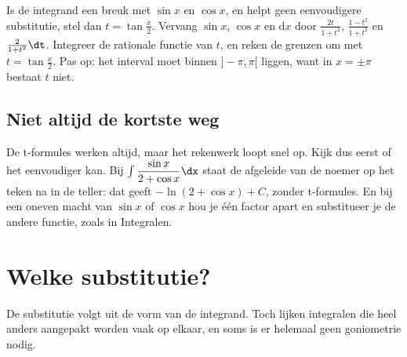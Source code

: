 \begin{werkwijze}
Is de integrand een breuk met $\sin x$ en $\cos x$, en helpt geen eenvoudigere substitutie, stel dan $t = \tan\tfrac x2$. Vervang $\sin x$, $\cos x$ en $\mathrm{d}x$ door $\tfrac{2t}{1 + t^2}$, $\tfrac{1 - t^2}{1 + t^2}$ en $\tfrac{2}{1 + t^2}\dt$. Integreer de rationale functie van $t$, en reken de grenzen om met $t = \tan\tfrac x2$. Pas op: het interval moet binnen $]-\pi, \pi[$ liggen, want in $x = \pm\pi$ bestaat $t$ niet.
\end{werkwijze}

\nujij{Bereken $\int \dfrac{1}{\sin x}\dx$ op $]0, \pi[$.}{$\int \dfrac{1 + t^2}{2t} \cdot \dfrac{2}{1 + t^2}\dt = \ln|t| + C = \ln\tan\dfrac x2 + C$.}

\begin{oefeningen}
\end{oefeningen}

\subsection{Niet altijd de kortste weg}

De t-formules werken altijd, maar het rekenwerk loopt snel op. Kijk dus eerst of het eenvoudiger kan. Bij $\int \dfrac{\sin x}{2 + \cos x}\dx$ staat de afgeleide van de noemer op het teken na in de teller: dat geeft $-\ln(2 + \cos x) + C$, zonder t-formules. En bij een oneven macht van $\sin x$ of $\cos x$ hou je één factor apart en substitueer je de andere functie, zoals in Integralen.

\begin{oefeningen}
\end{oefeningen}

\section{Welke substitutie?}

De substitutie volgt uit de vorm van de integrand. Toch lijken integralen die heel anders aangepakt worden vaak op elkaar, en soms is er helemaal geen goniometrie nodig.



